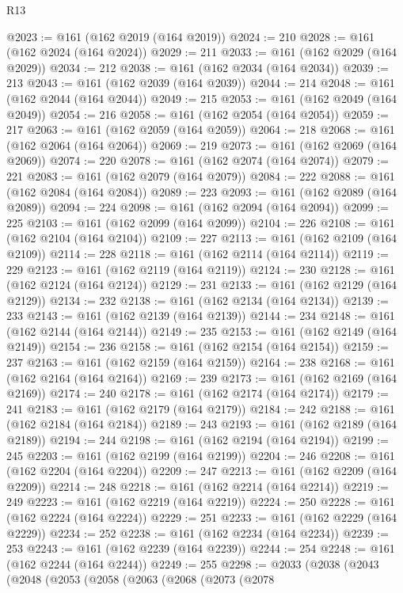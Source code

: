 \begin{lexlean}{R13}
\begin{coremodule}
@2023 := @161 (@162 @2019 (@164 @2019))
@2024 := 210
@2028 := @161 (@162 @2024 (@164 @2024))
@2029 := 211
@2033 := @161 (@162 @2029 (@164 @2029))
@2034 := 212
@2038 := @161 (@162 @2034 (@164 @2034))
@2039 := 213
@2043 := @161 (@162 @2039 (@164 @2039))
@2044 := 214
@2048 := @161 (@162 @2044 (@164 @2044))
@2049 := 215
@2053 := @161 (@162 @2049 (@164 @2049))
@2054 := 216
@2058 := @161 (@162 @2054 (@164 @2054))
@2059 := 217
@2063 := @161 (@162 @2059 (@164 @2059))
@2064 := 218
@2068 := @161 (@162 @2064 (@164 @2064))
@2069 := 219
@2073 := @161 (@162 @2069 (@164 @2069))
@2074 := 220
@2078 := @161 (@162 @2074 (@164 @2074))
@2079 := 221
@2083 := @161 (@162 @2079 (@164 @2079))
@2084 := 222
@2088 := @161 (@162 @2084 (@164 @2084))
@2089 := 223
@2093 := @161 (@162 @2089 (@164 @2089))
@2094 := 224
@2098 := @161 (@162 @2094 (@164 @2094))
@2099 := 225
@2103 := @161 (@162 @2099 (@164 @2099))
@2104 := 226
@2108 := @161 (@162 @2104 (@164 @2104))
@2109 := 227
@2113 := @161 (@162 @2109 (@164 @2109))
@2114 := 228
@2118 := @161 (@162 @2114 (@164 @2114))
@2119 := 229
@2123 := @161 (@162 @2119 (@164 @2119))
@2124 := 230
@2128 := @161 (@162 @2124 (@164 @2124))
@2129 := 231
@2133 := @161 (@162 @2129 (@164 @2129))
@2134 := 232
@2138 := @161 (@162 @2134 (@164 @2134))
@2139 := 233
@2143 := @161 (@162 @2139 (@164 @2139))
@2144 := 234
@2148 := @161 (@162 @2144 (@164 @2144))
@2149 := 235
@2153 := @161 (@162 @2149 (@164 @2149))
@2154 := 236
@2158 := @161 (@162 @2154 (@164 @2154))
@2159 := 237
@2163 := @161 (@162 @2159 (@164 @2159))
@2164 := 238
@2168 := @161 (@162 @2164 (@164 @2164))
@2169 := 239
@2173 := @161 (@162 @2169 (@164 @2169))
@2174 := 240
@2178 := @161 (@162 @2174 (@164 @2174))
@2179 := 241
@2183 := @161 (@162 @2179 (@164 @2179))
@2184 := 242
@2188 := @161 (@162 @2184 (@164 @2184))
@2189 := 243
@2193 := @161 (@162 @2189 (@164 @2189))
@2194 := 244
@2198 := @161 (@162 @2194 (@164 @2194))
@2199 := 245
@2203 := @161 (@162 @2199 (@164 @2199))
@2204 := 246
@2208 := @161 (@162 @2204 (@164 @2204))
@2209 := 247
@2213 := @161 (@162 @2209 (@164 @2209))
@2214 := 248
@2218 := @161 (@162 @2214 (@164 @2214))
@2219 := 249
@2223 := @161 (@162 @2219 (@164 @2219))
@2224 := 250
@2228 := @161 (@162 @2224 (@164 @2224))
@2229 := 251
@2233 := @161 (@162 @2229 (@164 @2229))
@2234 := 252
@2238 := @161 (@162 @2234 (@164 @2234))
@2239 := 253
@2243 := @161 (@162 @2239 (@164 @2239))
@2244 := 254
@2248 := @161 (@162 @2244 (@164 @2244))
@2249 := 255
@2298 := @2033
    (@2038
      (@2043
        (@2048
          (@2053
            (@2058
              (@2063
                (@2068
                  (@2073
                    (@2078

\end{coremodule}
\end{lexlean}

